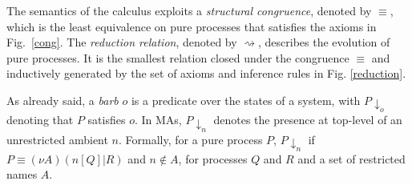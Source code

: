 \documentclass[copyright,creativecommons]{eptcs}
\newcommand{\barb}[1]{\downarrow_{#1}}
\newcommand{\react}{\rightsquigarrow}
\newcommand{\<}{\langle}
\renewcommand{\>}{\rangle}
\begin{document}
The semantics of the calculus
exploits a \emph{structural congruence}, denoted by $\equiv$, which is
the least equivalence on pure processes that satisfies the axioms in
Fig.~\ref{cong}.
The \emph{reduction relation}, denoted by $\react$,
describes the evolution of pure processes.
It is the smallest relation closed under the congruence $\equiv$ and
inductively generated by the set of axioms and inference rules in Fig. \ref{reduction}.

As already said, a \emph{barb} $o$ is a predicate over the states of a system,
with $P\barb{o}$ denoting that $P$ satisfies $o$.  In MAs, $P\barb{n}$
denotes the presence at top-level of an unrestricted ambient
$n$. Formally, for a pure process $P$, $P\barb{n}$ if $P \equiv (\nu
A)(n[Q]|R)$ and $n \not \in A$, for processes $Q$ and $R$ and a
set of restricted names $A$.
\end{document}
